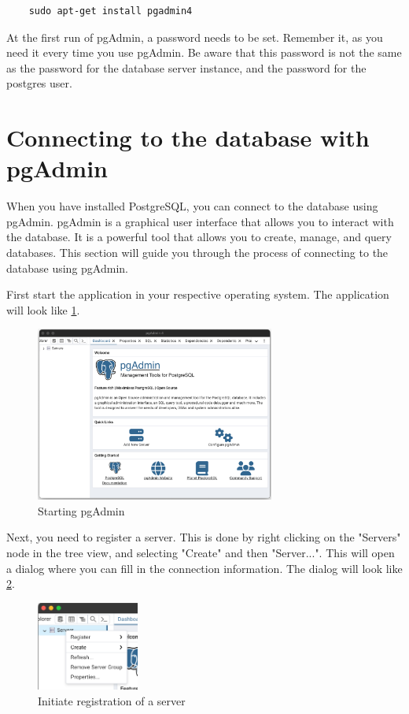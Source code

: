 \begin{verbatim}
    sudo apt-get install pgadmin4
\end{verbatim}

At the first run of pgAdmin, a password needs to be set. Remember it, as you need it every time you use pgAdmin. Be aware that this password is not the same as the password for the database server instance, and the password for the postgres user.

\section{Connecting to the database with pgAdmin}
When you have installed PostgreSQL, you can connect to the database using pgAdmin. pgAdmin is a graphical user interface that allows you to interact with the database. It is a powerful tool that allows you to create, manage, and query databases. This section will guide you through the process of connecting to the database using pgAdmin.

First start the application in your respective operating system. The application will look like \cref{fig:1.pgadmin1}.
\begin{figure}[H]
    \centering
    \includegraphics[width=0.7\textwidth]{content/1-relational-databases/figures/pgadmin/1.png}
    \caption{Starting pgAdmin}
    \label{fig:1.pgadmin1}
\end{figure}

Next, you need to register a server. This is done by right clicking on the "Servers" node in the tree view, and selecting "Create" and then "Server...". This will open a dialog where you can fill in the connection information. The dialog will look like \cref{fig:1.pgadmin2}.

\begin{figure}[H]
    \centering
    \includegraphics[width=0.3\textwidth]{content/1-relational-databases/figures/pgadmin/2.png}
    \caption{Initiate registration of a server}
    \label{fig:1.pgadmin2}
\end{figure}



